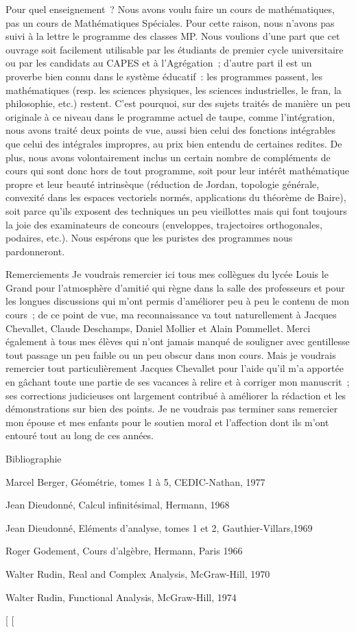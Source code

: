 \documentclass[]{article}
\begin{document}
Pour quel enseignement~? Nous avons voulu faire un cours de
mathématiques, pas un cours de Mathématiques Spéciales. Pour cette
raison, nous n'avons pas suivi à la lettre le programme des classes MP.
Nous voulions d'une part que cet ouvrage soit facilement utilisable par
les étudiants de premier cycle universitaire ou par les candidats au
CAPES et à l'Agrégation~; d'autre part il est un proverbe bien connu
dans le système éducatif~: les programmes passent, les mathématiques
(resp. les sciences physiques, les sciences industrielles, le
fran\ccais, la philosophie, etc.) restent. C'est
pourquoi, sur des sujets traités de manière un peu originale à ce niveau
dans le programme actuel de taupe, comme l'intégration, nous avons
traité deux points de vue, aussi bien celui des fonctions intégrables
que celui des intégrales impropres, au prix bien entendu de certaines
redites. De plus, nous avons volontairement inclus un certain nombre de
compléments de cours qui sont donc hors de tout programme, soit pour
leur intérêt mathématique propre et leur beauté intrinsèque (réduction
de Jordan, topologie générale, convexité dans les espaces vectoriels
normés, applications du théorème de Baire), soit parce qu'ils exposent
des techniques un peu vieillottes mais qui font toujours la joie des
examinateurs de concours (enveloppes, trajectoires orthogonales,
podaires, etc.). Nous espérons que les puristes des programmes nous
pardonneront.

Remerciements Je voudrais remercier ici tous mes collègues du lycée
Louis le Grand pour l'atmosphère d'amitié qui règne dans la salle des
professeurs et pour les longues discussions qui m'ont permis d'améliorer
peu à peu le contenu de mon cours~; de ce point de vue, ma
reconnaissance va tout naturellement à Jacques Chevallet, Claude
Deschamps, Daniel Mollier et Alain Pommellet. Merci également à tous mes
élèves qui n'ont jamais manqué de souligner avec gentillesse tout
passage un peu faible ou un peu obscur dans mon cours. Mais je voudrais
remercier tout particulièrement Jacques Chevallet pour l'aide qu'il m'a
apportée en gâchant toute une partie de ses vacances à relire et à
corriger mon manuscrit~; ses corrections judicieuses ont largement
contribué à améliorer la rédaction et les démonstrations sur bien des
points. Je ne voudrais pas terminer sans remercier mon épouse et mes
enfants pour le soutien moral et l'affection dont ils m'ont entouré tout
au long de ces années.

Bibliographie

Marcel Berger, Géométrie, tomes 1 à 5, CEDIC-Nathan, 1977

Jean Dieudonné, Calcul infinitésimal, Hermann, 1968

Jean Dieudonné, Eléments d'analyse, tomes 1 et 2, Gauthier-Villars,1969

Roger Godement, Cours d'algèbre, Hermann, Paris 1966

Walter Rudin, Real and Complex Analysis, McGraw-Hill, 1970

Walter Rudin, Functional Analysis, McGraw-Hill, 1974

[
[
\end{document}
